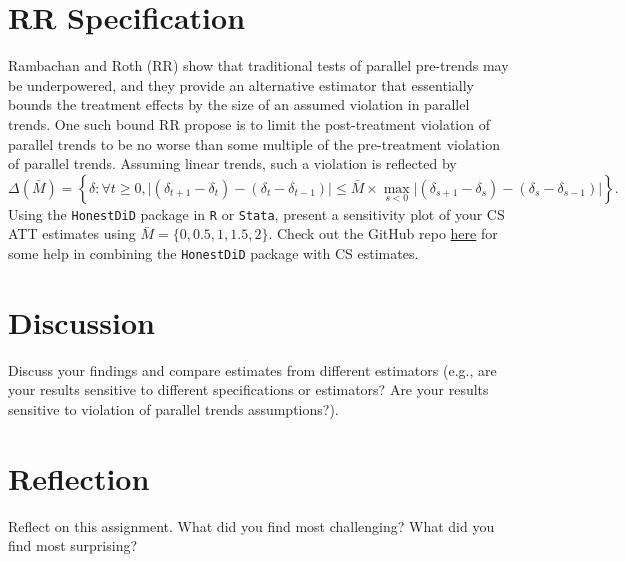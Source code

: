 \documentclass[
  12pt,
]{article}
\begin{document}
\hypertarget{rr-specification}{%
\section{RR Specification}\label{rr-specification}}

Rambachan and Roth (RR) show that traditional tests of parallel
pre-trends may be underpowered, and they provide an alternative
estimator that essentially bounds the treatment effects by the size of
an assumed violation in parallel trends. One such bound RR propose is to
limit the post-treatment violation of parallel trends to be no worse
than some multiple of the pre-treatment violation of parallel trends.
Assuming linear trends, such a violation is reflected by
\[\Delta(\bar{M}) = \left\{ \delta : \forall t \geq 0, \lvert (\delta_{t+1} - \delta_{t}) - (\delta_{t} - \delta_{t-1}) \rvert \leq \bar{M} \times \max_{s<0} \lvert (\delta_{s+1} - \delta_{s}) - (\delta_{s} - \delta_{s-1}) \rvert \right\}.\]
Using the \texttt{HonestDiD} package in \texttt{R} or \texttt{Stata},
present a sensitivity plot of your CS ATT estimates using
\(\bar{M} = \{0, 0.5, 1, 1.5, 2\}\). Check out the GitHub repo
\href{https://github.com/pedrohcgs/CS_RR}{here} for some help in
combining the \texttt{HonestDiD} package with CS estimates.

\hypertarget{discussion}{%
\section{Discussion}\label{discussion}}

Discuss your findings and compare estimates from different estimators
(e.g., are your results sensitive to different specifications or
estimators? Are your results sensitive to violation of parallel trends
assumptions?).

\hypertarget{reflection}{%
\section{Reflection}\label{reflection}}

Reflect on this assignment. What did you find most challenging? What did
you find most surprising?
\end{document}
